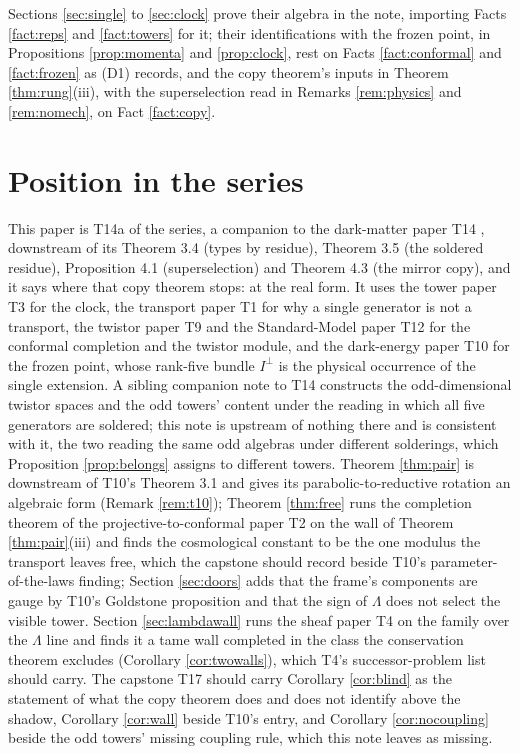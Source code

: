 \documentclass[11pt]{article}
\theoremstyle{definition}
\begin{document}
Sections \ref{sec:single} to \ref{sec:clock} prove their algebra in the note, importing Facts \ref{fact:reps} and \ref{fact:towers} for it; their identifications with the frozen point, in Propositions \ref{prop:momenta} and \ref{prop:clock}, rest on Facts \ref{fact:conformal} and \ref{fact:frozen} as (D1) records, and the copy theorem's inputs in Theorem \ref{thm:rung}(iii), with the superselection read in Remarks \ref{rem:physics} and \ref{rem:nomech}, on Fact \ref{fact:copy}.

\section{Position in the series}\label{sec:position}

This paper is T14a of the series, a companion to the dark-matter paper T14 \cite{ButlerT14}, downstream of its Theorem 3.4 (types by residue), Theorem 3.5 (the soldered residue), Proposition 4.1 (superselection) and Theorem 4.3 (the mirror copy), and it says where that copy theorem stops: at the real form. It uses the tower paper T3 \cite{ButlerT3} for the clock, the transport paper T1 \cite{ButlerT1} for why a single generator is not a transport, the twistor paper T9 \cite{ButlerT9} and the Standard-Model paper T12 \cite{ButlerT12} for the conformal completion and the twistor module, and the dark-energy paper T10 \cite{ButlerT10} for the frozen point, whose rank-five bundle $I^{\perp}$ is the physical occurrence of the single extension. A sibling companion note to T14 constructs the odd-dimensional twistor spaces and the odd towers' content under the reading in which all five generators are soldered; this note is upstream of nothing there and is consistent with it, the two reading the same odd algebras under different solderings, which Proposition \ref{prop:belongs} assigns to different towers. Theorem \ref{thm:pair} is downstream of T10's Theorem 3.1 and gives its parabolic-to-reductive rotation an algebraic form (Remark \ref{rem:t10}); Theorem \ref{thm:free} runs the completion theorem of the projective-to-conformal paper T2 \cite{ButlerT2} on the wall of Theorem \ref{thm:pair}(iii) and finds the cosmological constant to be the one modulus the transport leaves free, which the capstone should record beside T10's parameter-of-the-laws finding; Section \ref{sec:doors} adds that the frame's components are gauge by T10's Goldstone proposition and that the sign of $\Lambda$ does not select the visible tower. Section \ref{sec:lambdawall} runs the sheaf paper T4 \cite{ButlerT4} on the family over the $\Lambda$ line and finds it a tame wall completed in the class the conservation theorem excludes (Corollary \ref{cor:twowalls}), which T4's successor-problem list should carry. The capstone T17 \cite{ButlerT17} should carry Corollary \ref{cor:blind} as the statement of what the copy theorem does and does not identify above the shadow, Corollary \ref{cor:wall} beside T10's entry, and Corollary \ref{cor:nocoupling} beside the odd towers' missing coupling rule, which this note leaves as missing.
\end{document}
